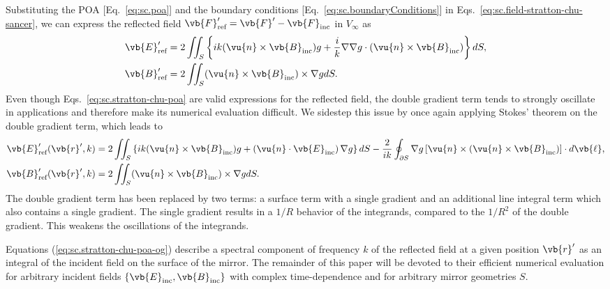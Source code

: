 \documentclass[11pt,SymmetricalJury]{inrsthesis/inrsthesis}
\begin{document}
Substituting the POA [Eq.~\eqref{eq:sc.poa}] and the boundary conditions
[Eq.~\eqref{eq:sc.boundaryConditions}] in Eqs.~\eqref{eq:sc.field-stratton-chu-sancer},
we can express the reflected field $\vb{F}'_\text{ref}=\vb{F}'-\vb{F}_\text{inc}$
in $V_\infty$ as
  \begin{subequations}
  \label{eq:sc.stratton-chu-poa}
  \begin{align}
    \label{eq:sc.stratton-chu-poa.efield}
    \vb{E}'_\text{ref}  &=  2\iint_S
      \left\{
        ik(\vu{n}\times\vb{B}_\text{inc})g
        +\frac{i}{k}\nabla\nabla g\cdot(\vu{n}\times\vb{B}_\text{inc})
        \right\}dS, \\
    \label{eq:sc.stratton-chu-poa.bfield}
    \vb{B}'_\text{ref}  &= 2\iint_S (\vu{n}\times\vb{B}_\text{inc})\times\nabla g dS.
  \end{align}
  \end{subequations}
Even though Eqs.~\eqref{eq:sc.stratton-chu-poa} are valid expressions
for the reflected field, the double gradient term tends to strongly oscillate in applications and therefore
make its numerical evaluation difficult. We sidestep this issue by once again applying
Stokes' theorem on the double gradient term, which leads to
  \begin{subequations}
  \label{eq:sc.stratton-chu-poa-og}
  \begin{align}
    \label{eq:sc.stratton-chu-poa-og.efield}
    \vb{E}'_\text{ref}(\vb{r}',k)  &= 2\iint_S
      \left\{
        ik(\vu{n}\times\vb{B}_\text{inc})g
        +\left(\vu{n}\cdot\vb{E}_\text{inc}\right)\nabla g
        \right\}dS
            - \frac{2}{ik}\oint_{\partial S}\nabla g
                    \left[\vu{n}\times(\vu{n}\times\vb{B}_\text{inc})\right]\cdot d\vb{\ell},\\
    \label{eq:sc.stratton-chu-poa-og.bfield}
    \vb{B}'_\text{ref}(\vb{r}',k)  &= 2\iint_S (\vu{n}\times\vb{B}_\text{inc})\times\nabla g dS.
  \end{align}
  \end{subequations}
The double gradient term has been replaced by two terms: a surface term with a
single gradient and an additional line integral term  which also contains
a single gradient. The single gradient results in a $1/R$ behavior of the integrands,
compared to the $1/R^2$ of the double gradient. This weakens the oscillations of
the integrands.

Equations (\ref{eq:sc.stratton-chu-poa-og}) describe a spectral component
of frequency $k$ of the reflected field at a given position $\vb{r}'$ as an integral
of the incident field on the surface of the mirror. The remainder of this paper
will be devoted to their efficient numerical evaluation for arbitrary incident
fields $\{\vb{E}_\text{inc},\vb{B}_\text{inc}\}$ with complex time-dependence
and for arbitrary mirror geometries $S$.
\end{document}
